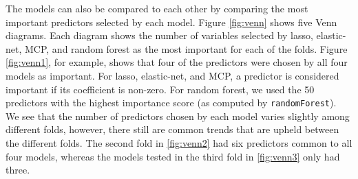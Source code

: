 \documentclass{article}
\begin{document}
	The models can also be compared to each other by comparing the most important predictors selected by each model. Figure \ref{fig:venn} shows five Venn diagrams. Each diagram shows the number of variables selected by lasso, elastic-net, MCP, and random forest as the most important for each of the folds. Figure \ref{fig:venn1}, for example, shows that four of the predictors were chosen by all four models as important. For lasso, elastic-net, and MCP, a predictor is considered important if its coefficient is non-zero. For random forest, we used the 50 predictors with the highest importance score (as computed by \lstinline!randomForest!). We see that the number of predictors chosen by each model varies slightly among different folds, however, there still are common trends that are upheld between the different folds. The second fold in \ref{fig:venn2} had six predictors common to all four models, whereas the models tested in the third fold in \ref{fig:venn3} only had three.
	
\end{document}
